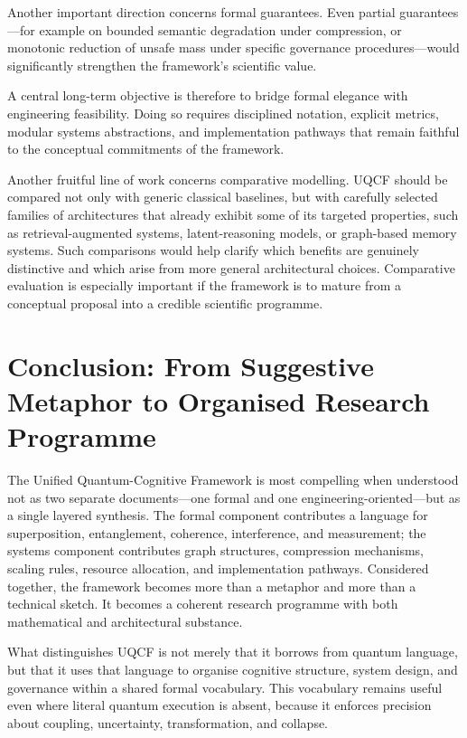 \documentclass[12pt]{article}
\begin{document}
Another important direction concerns formal guarantees. Even partial guarantees---for example on bounded semantic degradation under compression, or monotonic reduction of unsafe mass under specific governance procedures---would significantly strengthen the framework's scientific value.

A central long-term objective is therefore to bridge formal elegance with engineering feasibility. Doing so requires disciplined notation, explicit metrics, modular systems abstractions, and implementation pathways that remain faithful to the conceptual commitments of the framework.

Another fruitful line of work concerns comparative modelling. UQCF should be compared not only with generic classical baselines, but with carefully selected families of architectures that already exhibit some of its targeted properties, such as retrieval-augmented systems, latent-reasoning models, or graph-based memory systems. Such comparisons would help clarify which benefits are genuinely distinctive and which arise from more general architectural choices. Comparative evaluation is especially important if the framework is to mature from a conceptual proposal into a credible scientific programme.

\section{Conclusion: From Suggestive Metaphor to Organised Research Programme}
The Unified Quantum-Cognitive Framework is most compelling when understood not as two separate documents---one formal and one engineering-oriented---but as a single layered synthesis. The formal component contributes a language for superposition, entanglement, coherence, interference, and measurement; the systems component contributes graph structures, compression mechanisms, scaling rules, resource allocation, and implementation pathways. Considered together, the framework becomes more than a metaphor and more than a technical sketch. It becomes a coherent research programme with both mathematical and architectural substance.

What distinguishes UQCF is not merely that it borrows from quantum language, but that it uses that language to organise cognitive structure, system design, and governance within a shared formal vocabulary. This vocabulary remains useful even where literal quantum execution is absent, because it enforces precision about coupling, uncertainty, transformation, and collapse.
\end{document}

